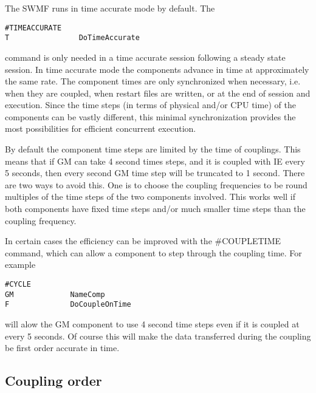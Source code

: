 The SWMF runs in time accurate mode by default. The
\begin{verbatim}
#TIMEACCURATE
T                DoTimeAccurate
\end{verbatim}
command is only needed in a time accurate session following a 
steady state session.
In time accurate mode the components advance in time at
approximately the same rate. The component times are
only synchronized when necessary, i.e. when they
are coupled, when restart files are written, or 
at the end of session and execution. Since the time
steps (in terms of physical and/or CPU time) of the components can be 
vastly different, this minimal synchronization provides the 
most possibilities for efficient concurrent execution.

By default the component time steps are limited by the
time of couplings. This means that if GM can take 4 second
times steps, and it is coupled with IE every 5 seconds,
then every second GM time step will be truncated to 1 second.
There are two ways to avoid this. One is to choose the
coupling frequencies to be round multiples of the time steps
of the two components involved. This works well if both components
have fixed time steps and/or much smaller time steps than the 
coupling frequency.

In certain cases the efficiency can be improved with the
\#COUPLETIME command, which can allow a component to 
step through the coupling time. For example
\begin{verbatim}
#CYCLE
GM             NameComp
F              DoCoupleOnTime
\end{verbatim}
will alow the GM component to use 4 second time steps even
if it is coupled at every 5 seconds. Of course this will
make the data transferred during the coupling be 
first order accurate in time.

\subsection{Coupling order}

